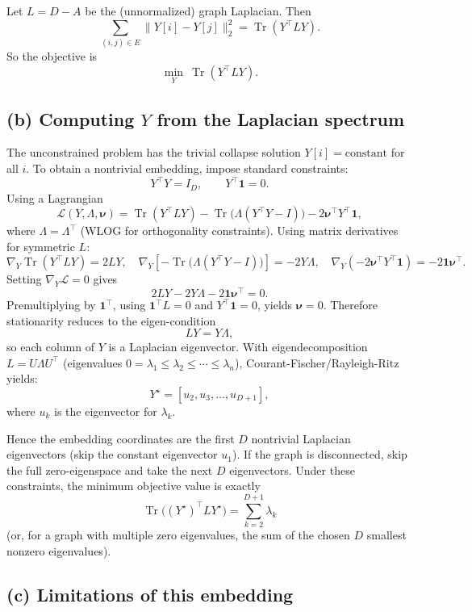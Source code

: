 \documentclass[11pt]{article}
\begin{document}
Let $L=D-A$ be the (unnormalized) graph Laplacian. Then
\[
\sum_{(i,j)\in E}\|Y[i]-Y[j]\|_2^2
=
\operatorname{Tr}(Y^{\top}LY).
\]
So the objective is
\[
\min_Y\ \operatorname{Tr}(Y^{\top}LY).
\]

\subsection*{(b) Computing $Y$ from the Laplacian spectrum}

The unconstrained problem has the trivial collapse solution $Y[i]=\text{constant}$ for all $i$. To obtain a nontrivial embedding, impose standard constraints:
\[
Y^{\top}Y=I_D,\qquad Y^{\top}\mathbf{1}=0.
\]
Using a Lagrangian
\[
\mathcal{L}(Y,\Lambda,\boldsymbol{\nu})
\!=\!
\operatorname{Tr}(Y^\top L Y)
-\operatorname{Tr}\!\big(\Lambda(Y^\top Y-I)\big)
-2\boldsymbol{\nu}^\top Y^\top \mathbf{1},
\]
where \(\Lambda=\Lambda^\top\) (WLOG for orthogonality constraints). Using matrix derivatives for symmetric \(L\):
\[
\nabla_Y\operatorname{Tr}(Y^\top L Y)=2LY,\quad
\nabla_Y\!\left[-\operatorname{Tr}\!\big(\Lambda(Y^\top Y-I)\big)\right]=-2Y\Lambda,\quad
\nabla_Y(-2\boldsymbol{\nu}^\top Y^\top\mathbf{1})=-2\mathbf{1}\boldsymbol{\nu}^\top.
\]
Setting \(\nabla_Y\mathcal{L}=0\) gives
\[
2LY-2Y\Lambda-2\mathbf{1}\boldsymbol{\nu}^\top=0.
\]
Premultiplying by \(\mathbf{1}^\top\), using \(\mathbf{1}^\top L=0\) and \(Y^\top\mathbf{1}=0\), yields \(\boldsymbol{\nu}=0\). Therefore stationarity reduces to the eigen-condition
\[
LY=Y\Lambda,
\]
so each column of \(Y\) is a Laplacian eigenvector. With eigendecomposition $L=U\Lambda U^{\top}$ (eigenvalues $0=\lambda_1\le\lambda_2\le\cdots\le\lambda_n$), Courant-Fischer/Rayleigh-Ritz yields:
\[
Y^{\star}=[u_2,u_3,\ldots,u_{D+1}],
\]
where $u_k$ is the eigenvector for $\lambda_k$.

Hence the embedding coordinates are the first $D$ nontrivial Laplacian eigenvectors (skip the constant eigenvector $u_1$). If the graph is disconnected, skip the full zero-eigenspace and take the next $D$ eigenvectors.
Under these constraints, the minimum objective value is exactly
\[
\operatorname{Tr}\!\big((Y^\star)^\top L Y^\star\big)=\sum_{k=2}^{D+1}\lambda_k
\]
(or, for a graph with multiple zero eigenvalues, the sum of the chosen \(D\) smallest nonzero eigenvalues).

\subsection*{(c) Limitations of this embedding}
\end{document}
